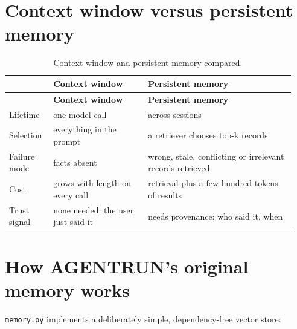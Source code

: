 \documentclass[10.5pt,a4paper,oneside]{report}
\begin{document}
\section{Context window versus persistent memory}
\begingroup\small\setlength{\tabcolsep}{4pt}\renewcommand{\arraystretch}{1.18}
\begin{longtable}{>{\raggedright\arraybackslash}p{0.141\linewidth}>{\raggedright\arraybackslash}p{0.311\linewidth}>{\raggedright\arraybackslash}p{0.489\linewidth}}
\caption{Context window and persistent memory compared.}\\
\toprule
\textbf{} & \textbf{Context window} & \textbf{Persistent memory} \\
\midrule
\endfirsthead
\toprule
\textbf{} & \textbf{Context window} & \textbf{Persistent memory} \\
\midrule
\endhead
\bottomrule
\endlastfoot
Lifetime & one model call & across sessions \\
Selection & everything in the prompt & a retriever chooses top-k records \\
Failure mode & facts absent & wrong, stale, conflicting or irrelevant records retrieved \\
Cost & grows with length on every call & retrieval plus a few hundred tokens of results \\
Trust signal & none needed: the user just said it & needs provenance: who said it, when \\
\end{longtable}
\endgroup

\section{How AGENTRUN's original memory works}
\texttt{memory.\allowbreak{}py} implements a deliberately simple, dependency-free vector store:
\end{document}
